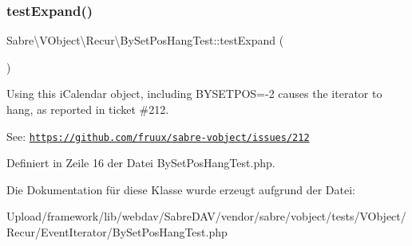 \subsubsection{\texorpdfstring{test\+Expand()}{testExpand()}}
{\footnotesize\ttfamily Sabre\textbackslash{}\+V\+Object\textbackslash{}\+Recur\textbackslash{}\+By\+Set\+Pos\+Hang\+Test\+::test\+Expand (\begin{DoxyParamCaption}{ }\end{DoxyParamCaption})}

Using this i\+Calendar object, including B\+Y\+S\+E\+T\+P\+OS=-\/2 causes the iterator to hang, as reported in ticket \#212.

See\+: \href{https://github.com/fruux/sabre-vobject/issues/212}{\tt https\+://github.\+com/fruux/sabre-\/vobject/issues/212} 

Definiert in Zeile 16 der Datei By\+Set\+Pos\+Hang\+Test.\+php.



Die Dokumentation für diese Klasse wurde erzeugt aufgrund der Datei\+:\begin{DoxyCompactItemize}
\item 
Upload/framework/lib/webdav/\+Sabre\+D\+A\+V/vendor/sabre/vobject/tests/\+V\+Object/\+Recur/\+Event\+Iterator/By\+Set\+Pos\+Hang\+Test.\+php\end{DoxyCompactItemize}

